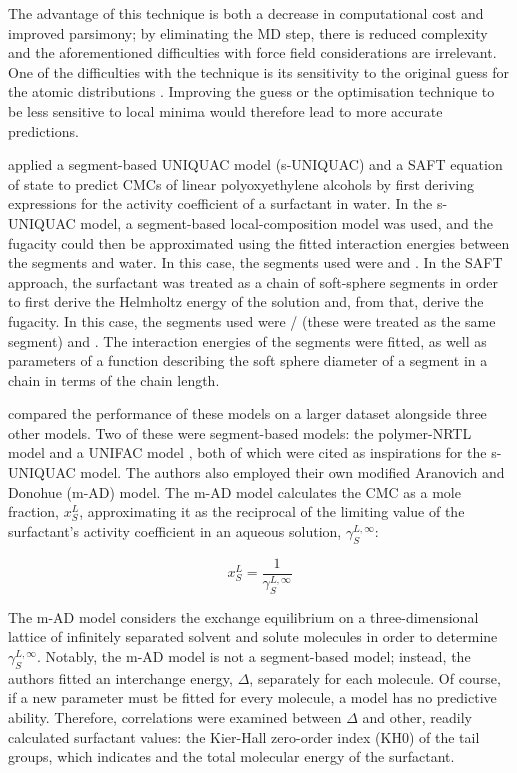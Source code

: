 The advantage of this technique is both a decrease in computational cost and
improved parsimony; by eliminating the MD step, there is reduced complexity and
the aforementioned difficulties with force field considerations are irrelevant.
One of the difficulties with the technique is its sensitivity to the original
guess for the atomic distributions
\cite{klamtCOSMOplexSelfconsistentSimulation2019}. Improving the guess or the
optimisation technique to be less sensitive to local minima would therefore lead
to more accurate predictions.

\citet{liStudiesUNIQUACSAFT1998} applied a segment-based UNIQUAC model (s-UNIQUAC) and a SAFT equation of state to predict CMCs of linear polyoxyethylene alcohols by first deriving expressions for the activity coefficient of a surfactant in water. In the s-UNIQUAC model, a segment-based local-composition model was used, and the fugacity could then be approximated using the fitted interaction energies between the segments and water. In this case, the segments used were  and . In the SAFT approach, the surfactant was treated as a chain of soft-sphere segments in order to first derive the Helmholtz energy of the solution and, from that, derive the fugacity. In this case, the segments used were / (these were treated as the same segment) and . The interaction energies of the segments were fitted, as well as parameters of a function describing the soft sphere diameter of a segment in a chain in terms of the chain length.

\citet{chengCorrelationCriticalMicelle2005} compared the performance of these models on a larger dataset alongside three other models. Two of these were segment-based models: the polymer-NRTL model \cite{liStudiesUNIQUACSAFT1998} and
a UNIFAC model \cite{voutsasPredictionCriticalMicelle2001}, both of which were cited as inspirations for the s-UNIQUAC model. The authors also employed their own modified Aranovich and Donohue (m-AD) model. The m-AD model calculates the
CMC as a mole fraction, $x_S^L$, approximating it as the reciprocal of the limiting value of the surfactant's activity coefficient in an aqueous solution,
$\gamma_S^{L,\infty}$:

\begin{equation}
    \label{eq:m-AD}
    x_S^L = \frac{1}{\gamma_S^{L,\infty}}
\end{equation}

The m-AD model considers the exchange equilibrium on a three-dimensional lattice of infinitely separated solvent and solute molecules in order to determine $\gamma_S^{L,\infty}$. Notably, the m-AD model is not a segment-based model;
instead, the authors fitted an interchange energy, $\Delta$, separately for each molecule. Of course, if a new parameter must be fitted for every molecule, a model has no predictive ability. Therefore, correlations were examined between
$\Delta$ and other, readily calculated surfactant values: the Kier-Hall zero-order index (KH0) of the tail groups, which indicates  and the total molecular energy of the surfactant.

